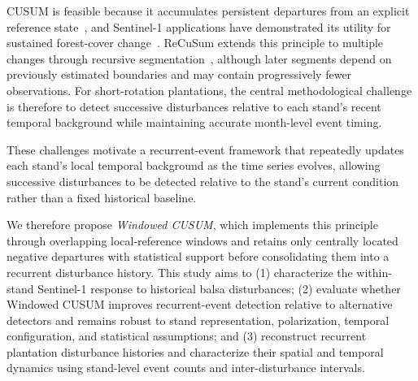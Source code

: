 

CUSUM is feasible because it accumulates persistent departures from an explicit reference state~\citep{Page1954CUSUM}, and Sentinel-1 applications have demonstrated its utility for sustained forest-cover change~\citep{RuizRamos2020CUSUMSMC,Ygorra2021CuSum}. ReCuSum extends this principle to multiple changes through recursive segmentation~\citep{Ygorra2023ReCuSum}, although later segments depend on previously estimated boundaries and may contain progressively fewer observations. For short-rotation plantations, the central methodological challenge is therefore to detect successive disturbances relative to each stand's recent temporal background while maintaining accurate month-level event timing.

These challenges motivate a recurrent-event framework that repeatedly updates each stand's local temporal background as the time series evolves, allowing successive disturbances to be detected relative to the stand's current condition rather than a fixed historical baseline. 

We therefore propose \textit{Windowed CUSUM}, which implements this principle through overlapping local-reference windows and retains only centrally located negative departures with statistical support before consolidating them into a recurrent disturbance history. This study aims to (1) characterize the within-stand Sentinel-1 response to historical balsa disturbances; (2) evaluate whether Windowed CUSUM improves recurrent-event detection relative to alternative detectors and remains robust to stand representation, polarization, temporal configuration, and statistical assumptions; and (3) reconstruct recurrent plantation disturbance histories and characterize their spatial and temporal dynamics using stand-level event counts and inter-disturbance intervals.




\FloatBarrier
